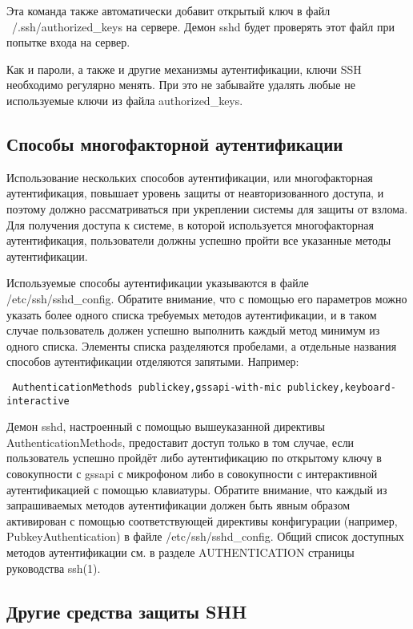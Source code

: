 \documentclass[a4paper,10pt,twoside]{article}
\begin{document}
Эта команда также автоматически добавит открытый ключ в файл ~/.ssh/authorized\_keys на сервере. Демон sshd будет проверять этот файл при попытке входа на сервер.

Как и пароли, а также и другие механизмы аутентификации, ключи SSH необходимо регулярно менять. При это не забывайте удалять любые не используемые ключи из файла authorized\_keys.


\subsection{Способы многофакторной аутентификации}

Использование нескольких способов аутентификации, или многофакторная аутентификация, повышает уровень защиты от неавторизованного доступа, и поэтому должно рассматриваться при укреплении системы для защиты от взлома. Для получения доступа к системе, в которой используется многофакторная аутентификация, пользователи должны успешно пройти все указанные методы аутентификации.

Используемые способы аутентификации указываются в файле /etc/ssh/sshd\_config. Обратите внимание, что с помощью его параметров можно указать более одного списка требуемых методов аутентификации, и в таком случае пользователь должен успешно выполнить каждый метод минимум из одного списка. Элементы списка разделяются пробелами, а отдельные названия способов аутентификации отделяются запятыми. Например:

\begin{verbatim}
 AuthenticationMethods publickey,gssapi-with-mic publickey,keyboard-interactive
\end{verbatim} 


Демон sshd, настроенный с помощью вышеуказанной директивы AuthenticationMethods, предоставит доступ только в том случае, если пользователь  успешно пройдёт либо аутентификацию по открытому ключу в совокупности с gssapi с микрофоном⁠ либо в совокупности с интерактивной аутентификацией с помощью клавиатуры. Обратите внимание, что каждый из запрашиваемых методов аутентификации должен быть явным образом активирован с помощью соответствующей директивы конфигурации (например, PubkeyAuthentication) в файле /etc/ssh/sshd\_config. Общий список доступных методов аутентификации см. в разделе AUTHENTICATION страницы руководства ssh(1).
⁠


\subsection{Другие средства защиты SHH}
\end{document}
